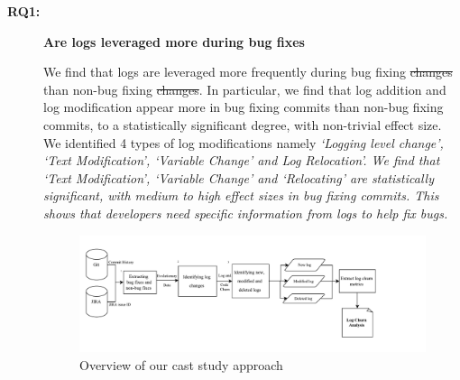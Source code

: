 \documentclass[conference]{IEEEtran}
\providecommand{\DIFadd}[1]{{\protect\color{blue}\uwave{#1}}} %
\providecommand{\DIFdel}[1]{{\protect\color{red}\sout{#1}}}                      %
\providecommand{\DIFaddbegin}{} %
\providecommand{\DIFaddend}{} %
\providecommand{\DIFdelbegin}{} %
\providecommand{\DIFdelend}{} %
\begin{document}
\begin{description}
\item[\textbf{RQ1:}]\textbf{Are logs leveraged more during bug fixes } 

We find that logs are leveraged more frequently during bug fixing \DIFdelbegin \DIFdel{changes }\DIFdelend \DIFaddbegin \DIFadd{commits }\DIFaddend than non-bug fixing \DIFdelbegin \DIFdel{changes}\DIFdelend \DIFaddbegin \DIFadd{commits}\DIFaddend . In particular, we find that log addition and log modification appear more in bug fixing commits than non-bug fixing commits, to a statistically significant degree, with non-trivial effect size. We identified 4 types of log modifications namely \em{`Logging level change', `Text Modification', `Variable Change'} and \em{Log Relocation'}. We find that \em{`Text Modification', `Variable Change'} and \em{`Relocating'} are statistically significant, with medium to high effect sizes in bug fixing commits. This shows that developers need specific information from logs to help fix bugs.


%
\begin{figure}
	\centering
	\includegraphics{MethdologyICESEM}
	\caption{ Overview of our cast study approach }
	\label{fig:MethodologyICSME}
\end{figure}



\end{description}
\end{document}
